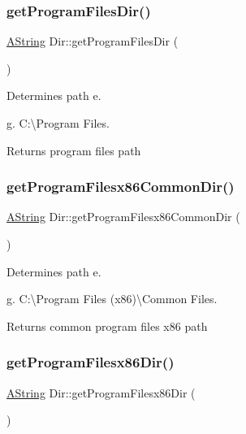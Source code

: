 \subsubsection{\texorpdfstring{getProgramFilesDir()}{getProgramFilesDir()}}
{\footnotesize\ttfamily \mbox{\hyperlink{class_a_string}{A\+String}} Dir\+::get\+Program\+Files\+Dir (\begin{DoxyParamCaption}{ }\end{DoxyParamCaption})\hspace{0.3cm}{\ttfamily [static]}}



Determines path e. 

g. C\+:\textbackslash{}\+Program Files. \begin{DoxyReturn}{Returns}
program files path 
\end{DoxyReturn}
\mbox{\label{class_dir_ae6a11abee4d5eeed4ddc784b498aaff2}} 
\subsubsection{\texorpdfstring{getProgramFilesx86CommonDir()}{getProgramFilesx86CommonDir()}}
{\footnotesize\ttfamily \mbox{\hyperlink{class_a_string}{A\+String}} Dir\+::get\+Program\+Filesx86\+Common\+Dir (\begin{DoxyParamCaption}{ }\end{DoxyParamCaption})\hspace{0.3cm}{\ttfamily [static]}}



Determines path e. 

g. C\+:\textbackslash{}\+Program Files (x86)\textbackslash{}\+Common Files. \begin{DoxyReturn}{Returns}
common program files x86 path 
\end{DoxyReturn}
\mbox{\label{class_dir_a24c088c429ae9a480111b94218605dc4}} 
\subsubsection{\texorpdfstring{getProgramFilesx86Dir()}{getProgramFilesx86Dir()}}
{\footnotesize\ttfamily \mbox{\hyperlink{class_a_string}{A\+String}} Dir\+::get\+Program\+Filesx86\+Dir (\begin{DoxyParamCaption}{ }\end{DoxyParamCaption})\hspace{0.3cm}{\ttfamily [static]}}



